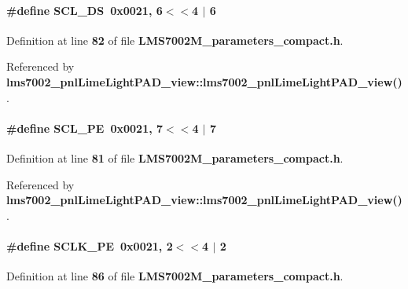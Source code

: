 \paragraph[{S\+C\+L\+\_\+\+DS}]{\setlength{\rightskip}{0pt plus 5cm}\#define S\+C\+L\+\_\+\+DS~0x0021, 6$<$$<$4 $\vert$  6}\label{LMS7002M__parameters__compact_8h_a5cb5bfa8e548b120b937e0596dab94b1}


Definition at line {\bf 82} of file {\bf L\+M\+S7002\+M\+\_\+parameters\+\_\+compact.\+h}.



Referenced by {\bf lms7002\+\_\+pnl\+Lime\+Light\+P\+A\+D\+\_\+view\+::lms7002\+\_\+pnl\+Lime\+Light\+P\+A\+D\+\_\+view()}.

\paragraph[{S\+C\+L\+\_\+\+PE}]{\setlength{\rightskip}{0pt plus 5cm}\#define S\+C\+L\+\_\+\+PE~0x0021, 7$<$$<$4 $\vert$  7}\label{LMS7002M__parameters__compact_8h_a06dec2f8f92dfc4801284cd03acad0de}


Definition at line {\bf 81} of file {\bf L\+M\+S7002\+M\+\_\+parameters\+\_\+compact.\+h}.



Referenced by {\bf lms7002\+\_\+pnl\+Lime\+Light\+P\+A\+D\+\_\+view\+::lms7002\+\_\+pnl\+Lime\+Light\+P\+A\+D\+\_\+view()}.

\paragraph[{S\+C\+L\+K\+\_\+\+PE}]{\setlength{\rightskip}{0pt plus 5cm}\#define S\+C\+L\+K\+\_\+\+PE~0x0021, 2$<$$<$4 $\vert$  2}\label{LMS7002M__parameters__compact_8h_afc161a2a7be48d140b77ff05b6cc90be}


Definition at line {\bf 86} of file {\bf L\+M\+S7002\+M\+\_\+parameters\+\_\+compact.\+h}.



